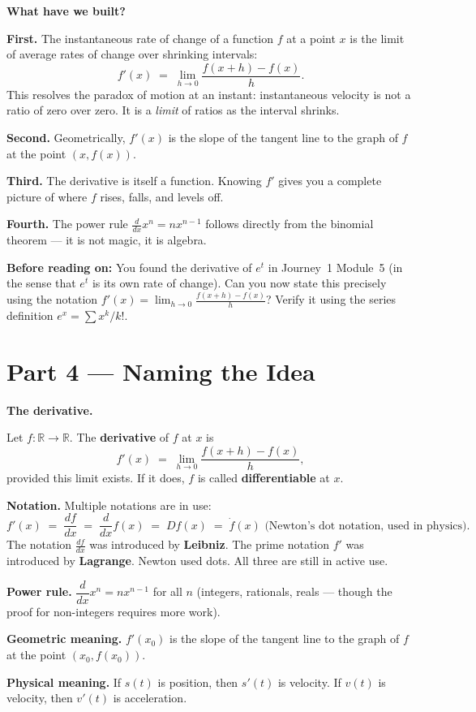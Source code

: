 \documentclass[12pt, a4paper]{article}
\begin{document}
\begin{discoverybox}
\textbf{What have we built?}

\textbf{First.} The instantaneous rate of change of a function $f$ at a point $x$ is the limit of average rates of change over shrinking intervals:
\[
  f'(x) \;=\; \lim_{h \to 0} \frac{f(x+h) - f(x)}{h}.
\]
This resolves the paradox of motion at an instant: instantaneous velocity is not a ratio of zero over zero. It is a \emph{limit} of ratios as the interval shrinks.

\textbf{Second.} Geometrically, $f'(x)$ is the slope of the tangent line to the graph of $f$ at the point $(x, f(x))$.

\textbf{Third.} The derivative is itself a function. Knowing $f'$ gives you a complete picture of where $f$ rises, falls, and levels off.

\textbf{Fourth.} The power rule $\frac{d}{dx}x^n = nx^{n-1}$ follows directly from the binomial theorem --- it is not magic, it is algebra.

\medskip
\textbf{Before reading on:} You found the derivative of $e^t$ in Journey~1 Module~5 (in the sense that $e^t$ is its own rate of change). Can you now state this precisely using the notation $f'(x) = \lim_{h\to 0}\frac{f(x+h)-f(x)}{h}$? Verify it using the series definition $e^x = \sum x^k/k!$.
\end{discoverybox}

\section{Part 4 \texorpdfstring{---}{--} Naming the Idea}

\begin{namebox}
\textbf{The derivative.}

Let $f : \mathbb{R} \to \mathbb{R}$. The \textbf{derivative} of $f$ at $x$ is
\[
  f'(x) \;=\; \lim_{h \to 0} \frac{f(x+h) - f(x)}{h},
\]
provided this limit exists. If it does, $f$ is called \textbf{differentiable} at $x$.

\medskip
\textbf{Notation.} Multiple notations are in use:
\[
  f'(x) \;=\; \frac{df}{dx} \;=\; \frac{d}{dx}f(x) \;=\; Df(x) \;=\; \dot{f}(x)\text{ (Newton's dot notation, used in physics)}.
\]
The notation $\frac{df}{dx}$ was introduced by \textbf{Leibniz}. The prime notation $f'$ was introduced by \textbf{Lagrange}. Newton used dots. All three are still in active use.

\medskip
\textbf{Power rule.} $\dfrac{d}{dx}x^n = nx^{n-1}$ for all $n$ (integers, rationals, reals --- though the proof for non-integers requires more work).

\medskip
\textbf{Geometric meaning.} $f'(x_0)$ is the slope of the tangent line to the graph of $f$ at the point $(x_0, f(x_0))$.

\medskip
\textbf{Physical meaning.} If $s(t)$ is position, then $s'(t)$ is velocity. If $v(t)$ is velocity, then $v'(t)$ is acceleration.
\end{namebox}
\end{document}
